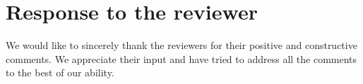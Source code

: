 \documentclass{response_to_reviewers}
\begin{document}
\section*{Response to the reviewer}

We would like to sincerely thank the reviewers for their positive and constructive comments. 
We appreciate their input and have tried to address all the comments to the best of our ability.






\end{document}
